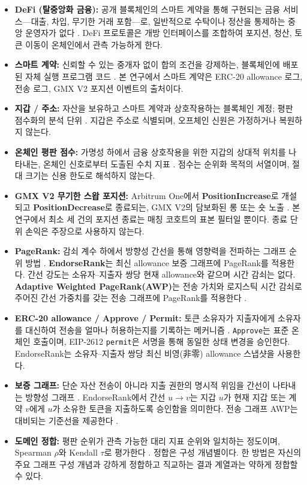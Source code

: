 \begin{itemize}
\item \textbf{DeFi (탈중앙화 금융):} 공개 블록체인의 스마트 계약을 통해 구현되는 금융 서비스---대출, 차입, 무기한 거래 포함---로, 일반적으로 수탁이나 정산을 통제하는 중앙 운영자가 없다 . DeFi 프로토콜은 개방 인터페이스를 조합하여 포지션, 청산, 토큰 이동이 온체인에서 관측 가능하게 한다.
\item \textbf{스마트 계약:} 신뢰할 수 있는 중개자 없이 합의 조건을 강제하는, 블록체인에 배포된 자체 실행 프로그램 코드 . 본 연구에서 스마트 계약은 ERC-20 allowance 로그, 전송 로그, GMX V2 포지션 이벤트의 출처이다.
\item \textbf{지갑 / 주소:} 자산을 보유하고 스마트 계약과 상호작용하는 블록체인 계정; 평판 점수화의 분석 단위 . 지갑은 주소로 식별되며, 오프체인 신원은 가정하거나 복원하지 않는다.
\item \textbf{온체인 평판 점수:} 가명성 하에서 금융 상호작용을 위한 지갑의 상대적 위치를 나타내는, 온체인 신호로부터 도출된 수치 지표 . 점수는 순위화 목적의 서열이며, 절대 크기는 신용 한도로 해석하지 않는다.
\item \textbf{GMX V2 무기한 스왑 포지션:} Arbitrum One에서 \textbf{PositionIncrease}로 개설되고 \textbf{PositionDecrease}로 종료되는, GMX V2의 담보화된 롱 또는 숏 노출 . 본 연구에서 최소 세 건의 포지션 종료는 매칭 코호트의 표본 필터일 뿐이다. 종료 단위 손익은 주장으로 사용하지 않는다.
\item \textbf{PageRank:} 감쇠 계수 하에서 방향성 간선을 통해 영향력을 전파하는 그래프 순위 방법 . \textbf{EndorseRank}는 최신 allowance 보증 그래프에 PageRank를 적용한다. 간선 강도는 소유자--지출자 쌍당 현재 allowance와 같으며 시간 감쇠는 없다. \textbf{Adaptive Weighted PageRank(AWP)}는 전송 가치와 로지스틱 시간 감쇠로 주어진 간선 가중치를 갖는 전송 그래프에 PageRank를 적용한다 .
\item \textbf{ERC-20 allowance / Approve / Permit:} 토큰 소유자가 지출자에게 소유자를 대신하여 전송을 얼마나 허용하는지를 기록하는 메커니즘 . \texttt{Approve}는 표준 온체인 호출이며, EIP-2612 \texttt{permit}은 서명을 통해 동일한 상태 변경을 승인한다. EndorseRank는 소유자--지출자 쌍당 최신 비영(非零) allowance 스냅샷을 사용한다.
\item \textbf{보증 그래프:} 단순 자산 전송이 아니라 지출 권한의 명시적 위임을 간선이 나타내는 방향성 그래프 . EndorseRank에서 간선 $u \to v$는 지갑 $u$가 현재 지갑 또는 계약 $v$에게 $u$가 소유한 토큰을 지출하도록 승인함을 의미한다. 전송 그래프 AWP는 대비되는 기준선을 제공한다 .
\item \textbf{도메인 정합:} 평판 순위가 관측 가능한 대리 지표 순위와 일치하는 정도이며, Spearman $\rho$와 Kendall $\tau$로 평가한다 . 정합은 구성 개념별이다. 한 방법은 자신의 주요 그래프 구성 개념과 강하게 정합하고 직교하는 결과 계열과는 약하게 정합할 수 있다.
\end{itemize}

